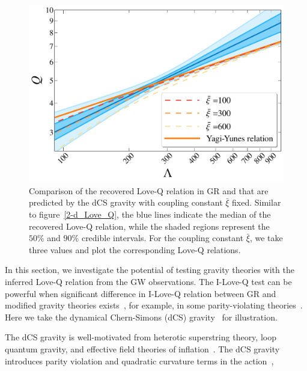 \documentclass[a4paper,11pt]{article}
\begin{document}
\begin{figure}[t]
    \centering
    \begin{minipage}{0.6\linewidth}
        \includegraphics[width=\linewidth]{fig_CS_xi_bar_2d.pdf}
    \end{minipage}
    \caption{Comparison of the recovered Love-Q relation in GR and that are
    predicted by the dCS gravity with coupling constant $\bar{\xi}$ fixed.
    Similar to figure~\ref{2-d_Love_Q}, the blue lines indicate the median of
    the recovered Love-Q relation, while the shaded regions represent the $50\%$
    and $90\%$ credible intervals. For the coupling constant $\bar\xi$, we take
    three values and plot the corresponding Love-Q relations.}
    \label{cs_Love_Q}
\end{figure}

In this section, we investigate the potential of testing gravity theories with
the inferred Love-Q relation from the GW observations. The I-Love-Q test can be 
powerful when significant difference in I-Love-Q relation between GR and
modified gravity theories exists~\cite{Shao:2022koz}, for example, in some
parity-violating theories~\cite{Yagi_2017, Yunes:2025xwp}.  Here we take the
dynamical Chern-Simons (dCS) gravity~\cite{Jackiw:2003pm, Smith:2007jm,
Alexander:2009tp} for illustration. 

The dCS gravity is well-motivated from heterotic superstring theory, loop
quantum gravity, and effective field theories of inflation~\cite{Jackiw:2003pm,
Smith:2007jm, Alexander:2009tp}.  The dCS gravity introduces parity violation
and quadratic curvature terms in the action~\cite{Alexander:2009tp,
Gupta:2017vsl},
\end{document}
